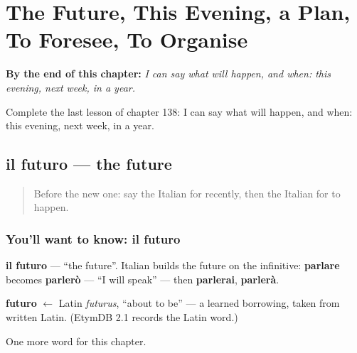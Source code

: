 
\chapter{The Future, This Evening, a Plan, To Foresee, To Organise}
\label{ch:it-the-future-this-evening-a-plan-to-foresee-to-organise}

\begin{chapteropening}
\textbf{By the end of this chapter:} \emph{I can say what will happen, and when: this evening, next week, in a year.}

Complete the last lesson of chapter 138: I can say what will happen, and when: this evening, next week, in a year.
\end{chapteropening}

\section[il futuro]{il futuro — the future}

\label{lesson:IT-C138-il-futuro}



\begin{quote}
Before the new one: say the Italian for recently, then the Italian for to happen.
\end{quote}

\subsection*{You'll want to know: il futuro}
\textbf{il futuro} — \textquotedblleft{}the future\textquotedblright{}. Italian builds the future on the infinitive: \textbf{parlare} becomes \textbf{parlerò} — \textquotedblleft{}I will speak\textquotedblright{} — then \textbf{parlerai}, \textbf{parlerà}.

\begin{cousinweb}
\textbf{futuro} $\leftarrow$ Latin \emph{futurus}, \textquotedblleft{}about to be\textquotedblright{} — a learned borrowing, taken from written Latin. (EtymDB 2.1 records the Latin word.)
\end{cousinweb}

\begin{grammarlens}[title={What you've built}]
One more word for this chapter.
\end{grammarlens}

